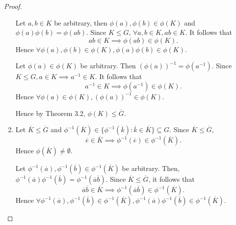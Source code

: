 \documentclass{article}
\theoremstyle{definition}
\begin{document}
\begin{proof}
\begin{enumerate}[label=(\roman*)]
         Let $a,b \in K$ be arbitrary, then $\phi(a), \phi(b) \in \phi(K)$ and $\phi(a)\phi(b) = \phi(ab)$. Since $K \leq G$, $\forall a,b \in K, ab \in K$. It follows that
         \begin{equation*}
             ab \in K \implies \phi(ab) \in \phi(K).
         \end{equation*}
         Hence $\forall \phi(a),\phi(b) \in \phi(K), \phi(a)\phi(b) \in \phi(K)$.
         
         Let $\phi(a) \in \phi(K)$ be arbitrary. Then $(\phi(a))^{-1} = \phi(a^{-1})$. Since $K \leq G, a \in K \implies a^{-1} \in K$. It follows that
         \begin{equation*}
             a^{-1} \in K \implies \phi(a^{-1}) \in \phi(K).
         \end{equation*}
         Hence $\forall \phi(a) \in \phi(K), (\phi(a))^{-1} \in \phi(K)$.
         
         Hence by Theorem 3.2, $\phi(K) \leq \overline{G}$.
         
         \item Let $\overline{K} \leq \overline{G}$ and $\phi^{-1}(\overline{K}) \in \{\phi^{-1}(\overline{k}): \overline{k} \in \overline{K}\} \subseteq G$. Since $\overline{K} \leq \overline{G}$,
         \begin{equation*}
             \overline{e} \in \overline{K} \implies \phi^{-1}(\overline{e}) \in \phi^{-1}(\overline{K}).
         \end{equation*}
         Hence $\phi(\overline{K}) \neq \emptyset$.
         
         Let $\phi^{-1}(\overline{a}), \phi^{-1}(\overline{b}) \in \phi^{-1}(\overline{K})$ be arbitrary. Then, $\phi^{-1}(\overline{a})\phi^{-1}(\overline{b}) = \phi^{-1}(\overline{a}\overline{b})$. Since $\overline{K} \leq \overline{G}$, it follows that
         \begin{equation*}
             \overline{a}\overline{b} \in \overline{K} \implies \phi^{-1}(\overline{a}\overline{b}) \in \phi^{-1}(\overline{K}).
         \end{equation*}
         Hence $\forall \phi^{-1}(\overline{a}), \phi^{-1}(\overline{b}) \in \phi^{-1}(\overline{K}), \phi^{-1}(\overline{a})\phi^{-1}(\overline{b}) \in \phi^{-1}(\overline{K})$.
         

\end{enumerate}
\end{proof}
\end{document}
